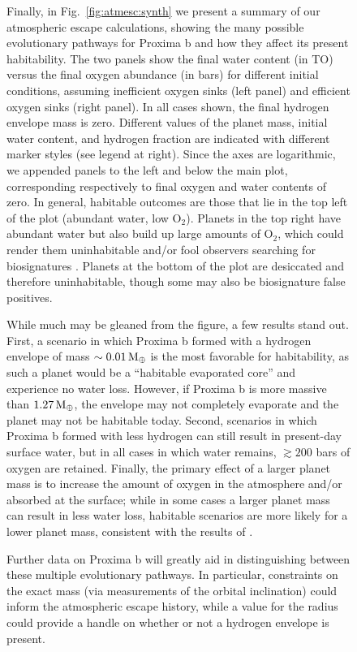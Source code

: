 \documentclass[preprint,12pt]{aastex}
\def\mearth{{\rm\,M_\oplus}}
\begin{document}
\begin{figure}
Finally, in Fig.~\ref{fig:atmesc:synth} we present a summary of our
atmospheric escape calculations, showing the many possible
evolutionary pathways for Proxima b and how they affect its present
habitability. The two panels show the final water content (in TO)
versus the final oxygen abundance (in bars) for different initial
conditions, assuming inefficient oxygen sinks (left panel) and
efficient oxygen sinks (right panel). In all cases shown, the final
hydrogen envelope mass is zero.  Different values of the planet mass,
initial water content, and hydrogen fraction are indicated with
different marker styles (see legend at right). Since the axes are
logarithmic, we appended panels to the left and below the main plot,
corresponding respectively to final oxygen and water contents of
zero. In general, habitable outcomes are those that lie in the top
left of the plot (abundant water, low O$_2$). Planets in the top right
have abundant water but also build up large amounts of O$_2$, which
could render them uninhabitable and/or fool
observers searching for biosignatures \citep{LugerBarnes15}. Planets at the bottom of the
plot are desiccated and therefore uninhabitable, though some may also
be biosignature false positives.

While much may be gleaned from the figure, a few results stand
out. First, a scenario in which Proxima b formed with a hydrogen
envelope of mass $\sim 0.01 \mearth$ is the most favorable for
habitability, as such a planet would be a ``habitable evaporated
core'' \citep{Luger15} and experience no water loss. However, if
Proxima b is more massive than $1.27 \mearth$, the envelope may not
completely evaporate and the planet may not be habitable
today. Second, scenarios in which Proxima b formed with less hydrogen
can still result in present-day surface water, but in all cases in
which water remains, $\gtrsim 200$ bars of oxygen are
retained. Finally, the primary effect of a larger planet mass is to
increase the amount of oxygen in the atmosphere and/or absorbed at the
surface; while in some cases a larger planet mass can result in less
water loss, habitable scenarios are more likely for a lower planet
mass, consistent with the results of \cite{LugerBarnes15}.

Further data on Proxima b will greatly aid in distinguishing between
these multiple evolutionary pathways. In particular, constraints on
the exact mass (via measurements of the orbital inclination) could
inform the atmospheric escape history, while a value for the radius
could provide a handle on whether or not a hydrogen envelope is
present.


\end{figure}
\end{document}
